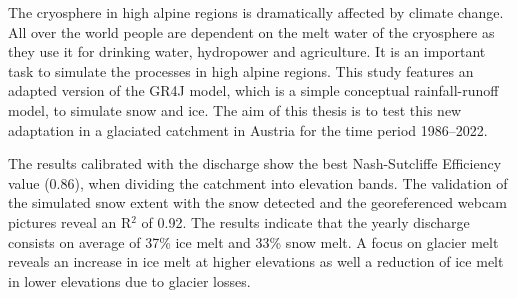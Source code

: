 {}
\begin{flushleft}





\end{flushleft}

\noindent


The cryosphere in high alpine regions is dramatically affected by climate change. All over the world people are dependent on the melt water of the cryosphere as they use it for drinking water, hydropower and agriculture. It is an important task to simulate the processes in high alpine regions. This study features an adapted version of the GR4J model, which is a simple conceptual rainfall-runoff model, to simulate snow and ice. The aim of this thesis is to test this new adaptation in a glaciated catchment in Austria for the time period 1986–2022.

The results calibrated with the discharge show the best Nash-Sutcliffe Efficiency value (0.86), when dividing the catchment into elevation bands. The validation of the simulated snow extent with the snow detected and the georeferenced webcam pictures reveal an R$^2$ of 0.92. The results indicate that the yearly discharge consists on average of 37\% ice melt and 33\% snow melt. A focus on glacier melt reveals an increase in ice melt at higher elevations as well a reduction of ice melt in lower elevations
due to glacier losses.
\newpage{}
{}
\begin{flushleft}





\end{flushleft}

